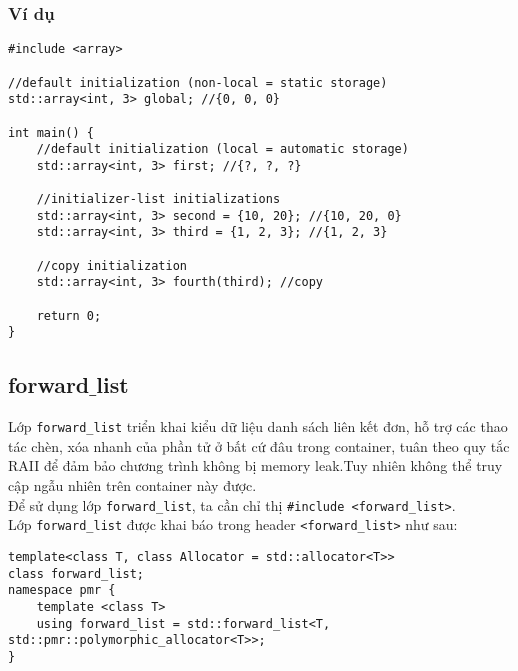 \subsubsection{Ví dụ}
\begin{lstlisting}
#include <array>

//default initialization (non-local = static storage)
std::array<int, 3> global; //{0, 0, 0}

int main() {
    //default initialization (local = automatic storage)
    std::array<int, 3> first; //{?, ?, ?}
    
    //initializer-list initializations
    std::array<int, 3> second = {10, 20}; //{10, 20, 0}
    std::array<int, 3> third = {1, 2, 3}; //{1, 2, 3}
    
    //copy initialization
    std::array<int, 3> fourth(third); //copy
    
    return 0;
}
\end{lstlisting}
\subsection{forward$\_$list}
Lớp \lstinline{forward_list} triển khai kiểu dữ liệu danh sách liên kết đơn, hỗ trợ các thao tác chèn, xóa nhanh của phần tử ở bất cứ đâu trong container, tuân theo quy tắc RAII để đảm bảo chương trình không bị memory leak.Tuy nhiên không thể truy cập ngẫu nhiên trên container này được.\\
Để sử dụng lớp \lstinline{forward_list}, ta cần chỉ thị \lstinline{#include <forward_list>}.\\
Lớp \lstinline{forward_list} được khai báo trong header \lstinline{<forward_list>} như sau: \cite{forlist}
\begin{lstlisting}
template<class T, class Allocator = std::allocator<T>> 
class forward_list;
namespace pmr {
    template <class T>
    using forward_list = std::forward_list<T, std::pmr::polymorphic_allocator<T>>;
}
\end{lstlisting}
